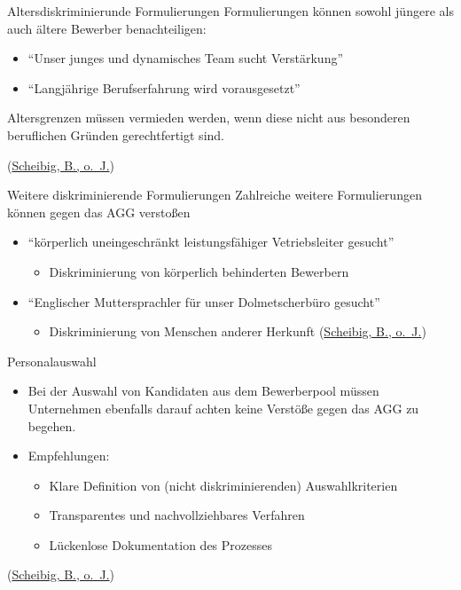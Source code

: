 \documentclass[
  10pt,
  ngerman,
  ignorenonframetext,
]{beamer}
\providecommand{\tightlist}{%
  \setlength{\itemsep}{0pt}\setlength{\parskip}{0pt}}
\begin{document}
\begin{frame}{Altersdiskriminierunde Formulierungen}
\protect\hypertarget{altersdiskriminierunde-formulierungen}{}
Formulierungen können sowohl jüngere als auch ältere Bewerber
benachteiligen:

\begin{itemize}
\tightlist
\item
  ``Unser junges und dynamisches Team sucht Verstärkung''
\item
  ``Langjährige Berufserfahrung wird vorausgesetzt''
\end{itemize}

Altersgrenzen müssen vermieden werden, wenn diese nicht aus besonderen
beruflichen Gründen gerechtfertigt sind.

(\protect\hyperlink{ref-ihk_wsb}{Scheibig, B., o.~J.})
\end{frame}

\begin{frame}{Weitere diskriminierende Formulierungen}
\protect\hypertarget{weitere-diskriminierende-formulierungen}{}
Zahlreiche weitere Formulierungen können gegen das AGG verstoßen

\begin{itemize}
\tightlist
\item
  ``körperlich uneingeschränkt leistungsfähiger Vetriebsleiter gesucht''

  \begin{itemize}
  \tightlist
  \item
    Diskriminierung von körperlich behinderten Bewerbern
  \end{itemize}
\item
  ``Englischer Muttersprachler für unser Dolmetscherbüro gesucht''

  \begin{itemize}
  \tightlist
  \item
    Diskriminierung von Menschen anderer Herkunft
    (\protect\hyperlink{ref-ihk_wsb}{Scheibig, B., o.~J.})
  \end{itemize}
\end{itemize}
\end{frame}

\begin{frame}{Personalauswahl}
\protect\hypertarget{personalauswahl}{}
\begin{itemize}
\item
  Bei der Auswahl von Kandidaten aus dem Bewerberpool müssen Unternehmen
  ebenfalls darauf achten keine Verstöße gegen das AGG zu begehen.
\item
  Empfehlungen:

  \begin{itemize}
  \tightlist
  \item
    Klare Definition von (nicht diskriminierenden) Auswahlkriterien
  \item
    Transparentes und nachvollziehbares Verfahren
  \item
    Lückenlose Dokumentation des Prozesses
  \end{itemize}
\end{itemize}

(\protect\hyperlink{ref-ihk_wsb}{Scheibig, B., o.~J.})
\end{frame}
\end{document}
